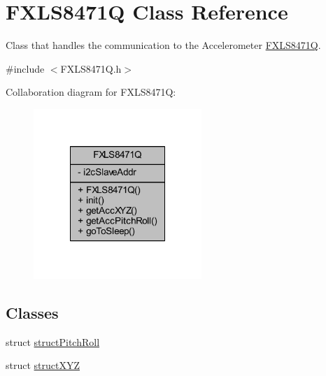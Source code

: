 \hypertarget{class_f_x_l_s8471_q}{}\section{F\+X\+L\+S8471Q Class Reference}
\label{class_f_x_l_s8471_q}


Class that handles the communication to the Accelerometer \hyperlink{class_f_x_l_s8471_q}{F\+X\+L\+S8471Q}.  




{\ttfamily \#include $<$F\+X\+L\+S8471\+Q.\+h$>$}



Collaboration diagram for F\+X\+L\+S8471Q\+:\nopagebreak
\begin{figure}[H]
\begin{center}
\leavevmode
\includegraphics[width=180pt]{class_f_x_l_s8471_q__coll__graph}
\end{center}
\end{figure}
\subsection*{Classes}
\begin{DoxyCompactItemize}
\item 
struct \hyperlink{struct_f_x_l_s8471_q_1_1struct_pitch_roll}{struct\+Pitch\+Roll}
\item 
struct \hyperlink{struct_f_x_l_s8471_q_1_1struct_x_y_z}{struct\+X\+YZ}
\end{DoxyCompactItemize}
